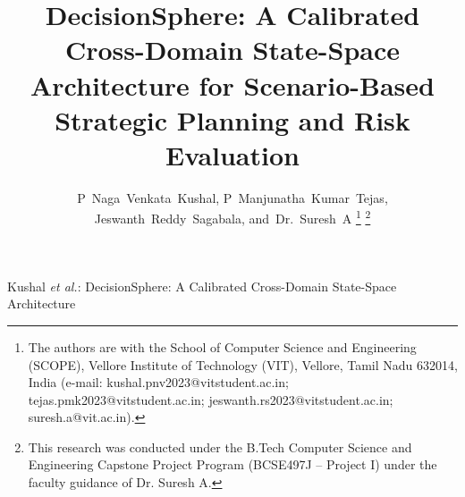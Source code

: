 \documentclass[journal]{IEEEtran}
\begin{document}
\title{DecisionSphere: A Calibrated Cross-Domain State-Space Architecture for Scenario-Based Strategic Planning and Risk Evaluation}

\author{P~Naga~Venkata~Kushal,
        P~Manjunatha~Kumar~Tejas,
        Jeswanth~Reddy~Sagabala,
        and~Dr.~Suresh~A%
\thanks{The authors are with the School of Computer Science and Engineering (SCOPE), Vellore Institute of Technology (VIT), Vellore, Tamil Nadu 632014, India (e-mail: kushal.pnv2023@vitstudent.ac.in; tejas.pmk2023@vitstudent.ac.in; jeswanth.rs2023@vitstudent.ac.in; suresh.a@vit.ac.in).}%
\thanks{This research was conducted under the B.Tech Computer Science and Engineering Capstone Project Program (BCSE497J -- Project I) under the faculty guidance of Dr. Suresh A.}%
}

%
{Kushal \MakeLowercase{\textit{et al.}}: DecisionSphere: A Calibrated Cross-Domain State-Space Architecture}

\maketitle
\end{document}
